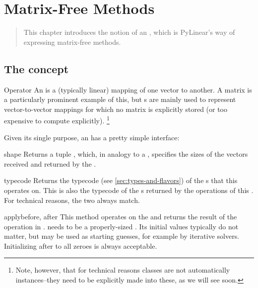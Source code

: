 \chapter{Matrix-Free Methods}
\label{cha:matrixfree}

\begin{quote}
   This chapter introduces the notion of an , which
   is PyLinear's way of expressing matrix-free methods.
\end{quote}

\section{The  concept}

\begin{classdesc*}{Operator}
  An  is a (typically linear) mapping
  of one vector to another. A matrix is a particularly prominent
  example of this, but s are mainly used to represent
  vector-to-vector mappings for which no matrix is explicitly stored (or too
  expensive to compute explicitly).
  \footnote{
    Note, however, that for technical reasons  classes are
    not automatically  instances--they need to be
    explicitly made into these, as we will see soon.
  }
\end{classdesc*}

Given its single purpose, an  has a pretty 
simple interface:
\begin{memberdesc}[Operator]{shape}
  Returns a tuple , which, in analogy to a ,
  specifies the sizes of the vectors received and returned by the
  .
\end{memberdesc}
\begin{methoddesc}[Operator]{typecode}{}
  Returns the typecode (see \ref{sec:types-and-flavors}) of the
  s that this  operates on. This is also
  the typecode of the s returned by the operations of this
  . For technical reasons, the two always match.
\end{methoddesc}
\begin{methoddesc}[Operator]{apply}{before, after}
  This method operates on the   and returns
  the result of the operation in . 
  needs to be a properly-sized . Its initial values
  typically do not matter, but may be used as starting guesses,
  for example by iterative solvers. Initializing after to
  all zeroes is always acceptable.
\end{methoddesc}

